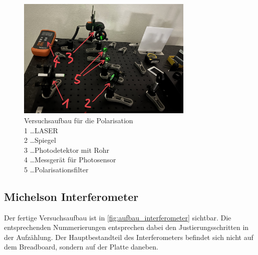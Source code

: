 \documentclass[12pt,english,ngerman]{scrartcl}
\begin{document}
\begin{figure}[H]
	\begin{center}
		\includegraphics[width =0.75\textwidth]{./figures/aufbau_polarisation.jpg}
	\end{center}
	\caption[Versuchsaufbau für die Polarisation] { Versuchsaufbau für die Polarisation \\
		1 \dots LASER                       \\
		2 \dots Spiegel                     \\
		3 \dots Photodetektor mit Rohr      \\
		4 \dots Messgerät für Photosensor   \\
		5 \dots Polarisationsfilter
	}\label{fig:aufbau_polarisation}
\end{figure}

\subsection{Michelson Interferometer}

Der fertige Versuchsaufbau ist in \autoref{fig:aufbau_interferometer} sichtbar.
Die entsprechenden Nummerierungen entsprechen dabei den Justierungsschritten in
der Aufzählung. Der Hauptbestandteil des Interferometers befindet sich nicht
auf dem Breadboard, sondern auf der Platte daneben.
\end{document}
